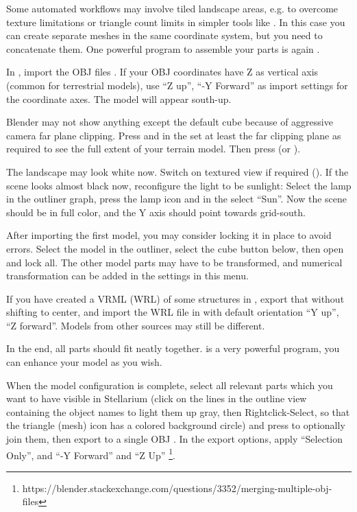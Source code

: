 Some automated workflows may involve tiled landscape areas, e.g. to
overcome texture limitations or triangle count limits in simpler tools
like . In this case you can create separate meshes
in the same coordinate system, but you need to concatenate them. One
powerful program to assemble your parts is again .

In , import the OBJ files . If your OBJ coordinates have Z as vertical axis (common for
terrestrial models), use ``Z up'', ``-Y Forward'' as import settings
for the coordinate axes. The model will appear south-up.

Blender may not show anything except the default cube because of
aggressive camera far plane clipping.  Press  and in the
 set at least the far clipping plane as required to see the full
extent of your terrain model. Then press  (or ).



The landscape may look white now. Switch on textured view if required
(). If the scene looks almost black now, reconfigure the
light to be sunlight: Select the lamp in the outliner graph, press the
lamp icon and in the  select ``Sun''. Now the scene should
be in full color, and the Y axis should point towards grid-south.

After importing the first model, you may consider locking it in place
to avoid errors. Select the model in the outliner, select the cube
button below, then open  and lock all. The other
model parts may have to be transformed, and numerical transformation
can be added in the  settings in this menu.

If you have created a VRML (WRL) of some structures in ,
export that without shifting to center, and import the WRL file in
 with default orientation ``Y up'', ``Z
forward''. Models from other sources may still be different.

In the end, all parts should fit neatly together.  is
a very powerful program, you can enhance your model as you wish.

When the model configuration is complete, select all relevant parts
which you want to have visible in Stellarium (click on the lines in
the outline view containing the object names to light them up gray,
then Rightclick-Select, so that the triangle (mesh) icon has a colored
background circle) and press  to optionally join them,
then export to a single OBJ . In the
export options, apply ``Selection Only'', and ``-Y Forward'' and ``Z
Up''%
\footnote{https://blender.stackexchange.com/questions/3352/merging-multiple-obj-files}.

